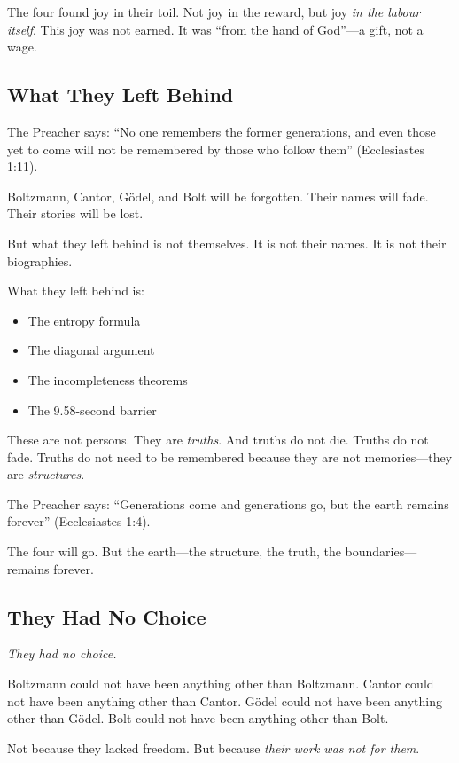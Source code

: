 \documentclass[11pt,a4paper]{article}
\begin{document}
The four found joy in their toil. Not joy in the reward, but joy \emph{in the 
labour itself}. This joy was not earned. It was ``from the hand of God''—a 
gift, not a wage.

\subsection{What They Left Behind}

The Preacher says: ``No one remembers the former generations, and even those 
yet to come will not be remembered by those who follow them'' (Ecclesiastes 
1:11).

Boltzmann, Cantor, Gödel, and Bolt will be forgotten. Their names will fade. 
Their stories will be lost.

But what they left behind is not themselves. It is not their names. It is not 
their biographies.

What they left behind is:
\begin{itemize}[leftmargin=2em]
\item The entropy formula
\item The diagonal argument
\item The incompleteness theorems
\item The 9.58-second barrier
\end{itemize}

These are not persons. They are \emph{truths}. And truths do not die. Truths 
do not fade. Truths do not need to be remembered because they are not 
memories—they are \emph{structures}.

The Preacher says: ``Generations come and generations go, but the earth 
remains forever'' (Ecclesiastes 1:4).

The four will go. But the earth—the structure, the truth, the boundaries—
remains forever.

\subsection{They Had No Choice}

\emph{They had no choice.}

Boltzmann could not have been anything other than Boltzmann. Cantor could not 
have been anything other than Cantor. Gödel could not have been anything other 
than Gödel. Bolt could not have been anything other than Bolt.

Not because they lacked freedom. But because \emph{their work was not for 
them}.
\end{document}
